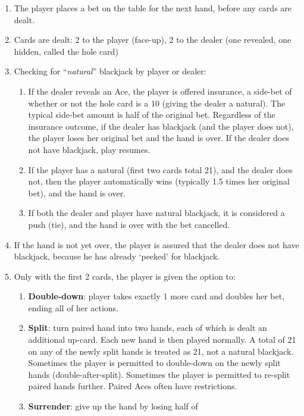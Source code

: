 \begin{enumerate}
\item The player places a bet on the table for the next hand, 
before any cards are dealt.
\item Cards are dealt: 2 to the player (face-up), 
2 to the dealer (one revealed, one hidden, called the hole card)
\item Checking for ``\emph{natural}'' blackjack by player or 
dealer:
\begin{enumerate}
\item If the dealer reveals an Ace, the player is offered 
insurance,
a side-bet of whether or not the hole card is a 10 
(giving the dealer a natural).
The typical side-bet amount is half of the original bet.
Regardless of the insurance outcome, 
if the dealer has blackjack (and the player does not),
the player loses her original bet and the hand is over.
If the dealer does not have blackjack, play resumes.  
\item If the player has a natural (first two cards total 21), 
and the dealer does not, then the player automatically wins
(typically 1.5 times her original bet), and the hand is over.
\item If both the dealer and player have natural blackjack, 
it is considered a push (tie), 
and the hand is over with the bet cancelled.  
\end{enumerate}
\item If the hand is not yet over, 
the player is assured that the dealer does not have blackjack, 
because he has already `peeked' for blackjack.
\item Only with the first 2 cards, the player is given the option to:
\begin{enumerate}
\item \textbf{Double-down}: player takes exactly 1 more card 
and doubles her bet, ending all of her actions.
\item \textbf{Split}: turn paired hand into two hands, 
each of which is dealt an additional up-card.  
Each new hand is then played normally.
A total of 21 on any of the newly split hands is treated as 21, 
not a natural blackjack.
Sometimes the player is permitted to double-down on the newly 
split hands (double-after-split).
Sometimes the player is permitted to re-split paired hands further.
Paired Aces often have restrictions.  
\item \textbf{Surrender}: give up the hand by losing half of 

\end{enumerate}
\end{enumerate}
